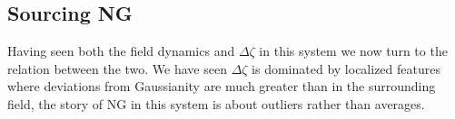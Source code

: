 

\subsection{Sourcing NG} \label{sec:zeta production}




Having seen both the field dynamics and $\Delta\zeta$ in this system we now turn to the relation between the two.
We have seen $\Delta\zeta$ is dominated by localized features where deviations from Gaussianity are much greater than in the surrounding field, the story of NG in this system is about outliers rather than averages.


